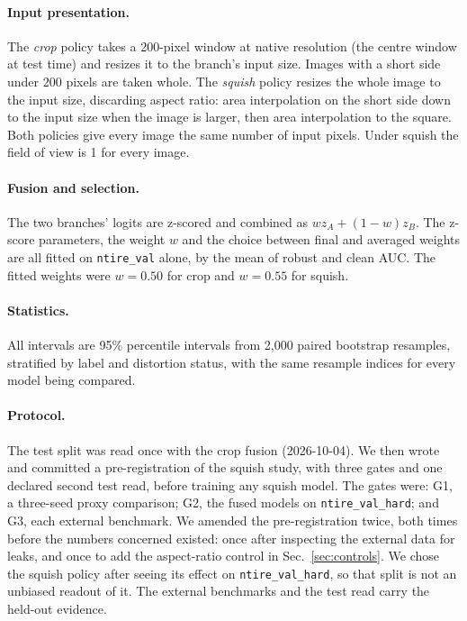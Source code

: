 \documentclass[10pt,twocolumn,letterpaper]{article}
\begin{document}
\paragraph{Input presentation.} The \emph{crop} policy takes a 200-pixel
window at native resolution (the centre window at test time) and resizes it to
the branch's input size. Images with a short side under 200 pixels are taken
whole. The \emph{squish} policy resizes the whole image to the input size,
discarding aspect ratio: area interpolation on the short side down to the input
size when the image is larger, then area interpolation to the square. Both
policies give every image the same number of input pixels. Under squish the
field of view is 1 for every image.

\paragraph{Fusion and selection.} The two branches' logits are z-scored and
combined as $w z_A + (1-w) z_B$. The z-score parameters, the weight $w$ and the
choice between final and averaged weights are all fitted on
\texttt{ntire\_val} alone, by the mean of robust and clean AUC. The fitted
weights were $w = 0.50$ for crop and $w = 0.55$ for squish.

\paragraph{Statistics.} All intervals are 95\% percentile intervals from 2,000
paired bootstrap resamples, stratified by label and distortion status, with
the same resample indices for every model being compared.

\paragraph{Protocol.} The test split was read once with the crop fusion
(2026-10-04). We then wrote and committed a pre-registration of the squish
study, with three gates and one declared second test read, before training any
squish model. The gates were: G1, a three-seed proxy comparison; G2, the
fused models on \texttt{ntire\_val\_hard}; and G3, each external benchmark. We
amended the pre-registration twice, both times before the numbers concerned
existed: once after inspecting the external data for leaks, and once to add
the aspect-ratio control in Sec.~\ref{sec:controls}. We chose the squish
policy after seeing its effect on \texttt{ntire\_val\_hard}, so that split is
not an unbiased readout of it. The external benchmarks and the test read
carry the held-out evidence.
\end{document}
